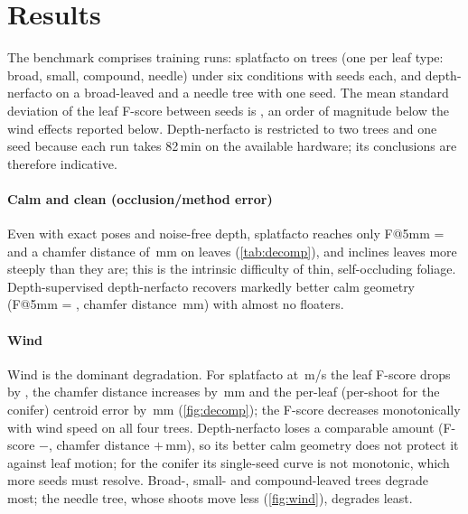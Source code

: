\documentclass[preprint,11pt,authoryear]{elsarticle}
\begin{document}
\section{Results}\label{sec:results}
The benchmark comprises \NResultRuns{} training runs: splatfacto on \NResultTrees{} trees (one per leaf type: broad, small, compound, needle) under six conditions with \NResultSeeds{} seeds each, and depth-nerfacto on a broad-leaved and a needle tree with one seed. The mean standard deviation of the leaf F-score between seeds is \SpSeedStdF{}, an order of magnitude below the wind effects reported below. Depth-nerfacto is restricted to two trees and one seed because each run takes 82\,min on the available hardware; its conclusions are therefore indicative.

\begin{table}[t]
\centering\small
\caption{Benchmark results, mean over trees (and seeds). CD: capped chamfer distance; Area err: relative leaf-area error; Angle W1: leaf inclination distribution distance.}
\label{tab:results}
\resizebox{\linewidth}{!}{}
\end{table}

\paragraph{Calm and clean (occlusion/method error)} Even with exact poses and noise-free depth, splatfacto reaches only F@5mm = \SpBaseF{} and a chamfer distance of \SpBaseCD\,mm on leaves (\cref{tab:decomp}), and inclines leaves more steeply than they are; this is the intrinsic difficulty of thin, self-occluding foliage. Depth-supervised depth-nerfacto recovers markedly better calm geometry (F@5mm = \NfBaseF{}, chamfer distance \NfBaseCD\,mm) with almost no floaters.

\paragraph{Wind} Wind is the dominant degradation. For splatfacto at \WindMax\,m/s the leaf F-score drops by \SpWindHiF{}, the chamfer distance increases by \SpWindHiCD\,mm and the per-leaf (per-shoot for the conifer) centroid error by \SpWindHiCentroid\,mm (\cref{fig:decomp}); the F-score decreases monotonically with wind speed on all four trees. Depth-nerfacto loses a comparable amount (F-score $-$\NfWindHiF{}, chamfer distance $+$\NfWindHiCD\,mm), so its better calm geometry does not protect it against leaf motion; for the conifer its single-seed curve is not monotonic, which more seeds must resolve. Broad-, small- and compound-leaved trees degrade most; the needle tree, whose shoots move less (\cref{fig:wind}), degrades least.
\end{document}
